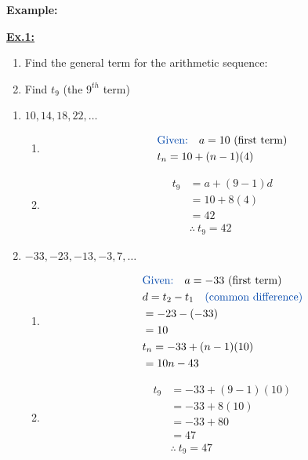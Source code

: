 \documentclass[12pt,a4paper]{article}
\newenvironment{example}
  {\begin{framed}\colorbox{examplecolor}{
  \parbox{\dimexpr\linewidth-2\fboxsep}{
  \textbf{Example:}}}}
  {\end{framed}}
\begin{document}
\begin{example}
    \underline{\textbf{Ex.1:}}
    \begin{enumerate}[label=\alph*.]
        \item Find the general term for the arithmetic sequence:
        \item Find $t_9$ (the $9^{th}$ term)
    \end{enumerate}
    
    \begin{enumerate}[label=\roman*)]
        \item $10, 14, 18, 22, \ldots$
        \begin{enumerate}[label=\alph*.]
            \item 
            \begin{align*}
                &\text{\textcolor{blue}{Given:}} \quad a = 10 \text{ (first term)} \\
                &t_n = 10 + (n-1)(4)
            \end{align*}
            \item 
            \begin{align*}
                t_9 &= a + (9-1)d \\ 
                &= 10 + 8(4) \\ 
                &= 42 \\
                &\boxed{\therefore\ t_9 = 42}
            \end{align*}
        \end{enumerate}
        \item $-33, -23, -13, -3, 7, \ldots$
        \begin{enumerate}[label=\alph*.]
            \item 
            \begin{align*}
                &\text{\textcolor{blue}{Given:}} \quad a = -33 \text{ (first term)} \\
                &d = t_2 - t_1 \quad \text{\textcolor{blue}{(common difference)}} \\
                &= -23 - (-33) \\
                &= 10 \\
                &t_n = -33 + (n-1)(10) \\
                &= 10n - 43
            \end{align*}
            \item 
            \begin{align*}
                t_9 &= -33 + (9-1)(10) \\
                &= -33 + 8(10) \\
                &= -33 + 80 \\
                &= 47 \\
                &\boxed{\therefore\ t_9 = 47}
            \end{align*}
        \end{enumerate}
    \end{enumerate}
\end{example}
\end{document}
